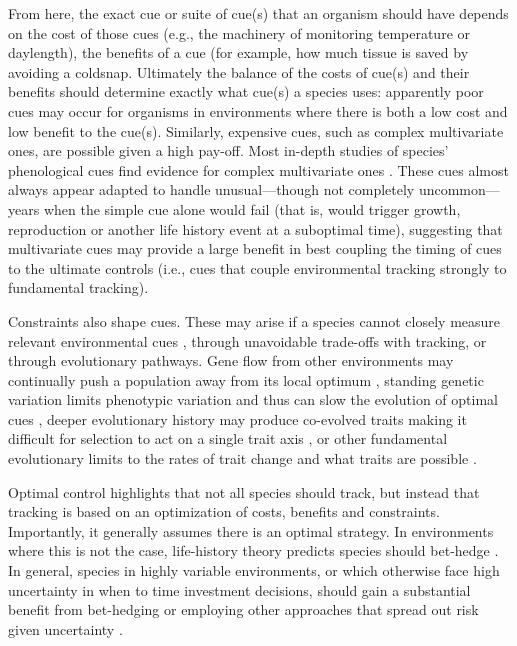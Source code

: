 \documentclass[11pt,letterpaper]{article}
\begin{document}
From here, the exact cue or suite of cue(s) that an organism should have depends on the cost of those cues (e.g., the machinery of monitoring temperature or daylength), the benefits of a cue (for example, how much tissue is saved by avoiding a coldsnap. Ultimately the balance of the costs of cue(s) and their benefits should determine exactly what cue(s) a species uses: apparently poor cues may occur for organisms in environments where there is both a low cost and low benefit to the cue(s). Similarly, expensive cues, such as complex multivariate ones, are possible given a high pay-off. Most in-depth studies of species' phenological cues find evidence for complex multivariate ones \citep{chuinearees}. These cues almost always appear adapted to handle unusual---though not completely uncommon---years when the simple cue alone would fail (that is, would trigger growth, reproduction or another life history event at a suboptimal time), suggesting that multivariate cues may provide a large benefit in best coupling the timing of cues to the ultimate controls (i.e., cues that couple environmental tracking strongly to fundamental tracking). 

Constraints also shape cues. These may arise if a species cannot closely measure relevant environmental cues \citep{arnold1992,Singer:2010eb}, through unavoidable trade-offs \citep{levins1968} with tracking, or through evolutionary pathways. Gene flow from other environments may continually push a population away from its local optimum \citep{lenormand2002}, standing genetic variation limits phenotypic variation and thus can slow the evolution of optimal cues \citep{Franks:2007wd,ghalambor2015}, deeper evolutionary history may produce co-evolved traits making it difficult for selection to act on a single trait axis \citep{Ackerly:2009ly}, or other fundamental evolutionary limits to the rates of trait change and what traits are possible \citep{spandrels}. 

Optimal control highlights that not all species should track, but instead that tracking is based on an optimization of costs, benefits and constraints. Importantly, it generally assumes there is an optimal strategy. In environments where this is not the case, life-history theory predicts species should bet-hedge \citep{decasas2015}. In general, species in highly variable environments, or which otherwise face high uncertainty in when to time investment decisions, should gain a substantial benefit from bet-hedging or employing other approaches that spread out risk given uncertainty \citep{Venable:2007os,donald2013}. %
\end{document}
